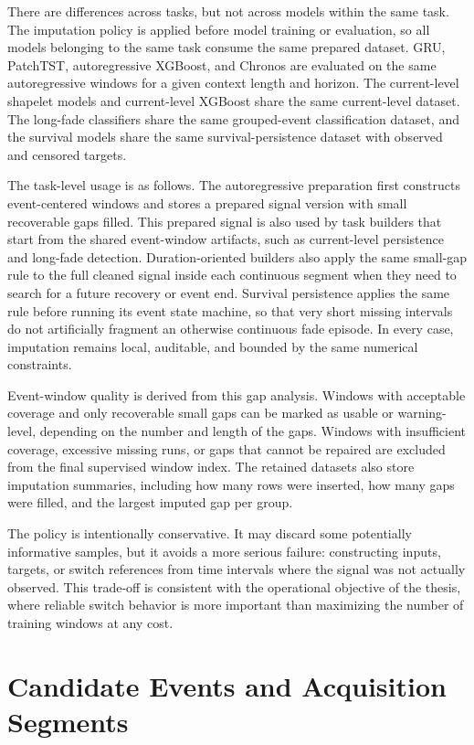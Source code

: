 There are differences across tasks, but not across models within the same
task. The imputation policy is applied before model training or evaluation, so
all models belonging to the same task consume the same prepared dataset. GRU,
PatchTST, autoregressive XGBoost, and Chronos are evaluated on the same
autoregressive windows for a given context length and horizon. The
current-level shapelet models and current-level XGBoost share the same
current-level dataset. The long-fade classifiers share the same grouped-event
classification dataset, and the survival models share the same
survival-persistence dataset with observed and censored targets.

The task-level usage is as follows. The autoregressive preparation first
constructs event-centered windows and stores a prepared signal version with
small recoverable gaps filled. This prepared signal is also used by task
builders that start from the shared event-window artifacts, such as
current-level persistence and long-fade detection. Duration-oriented builders
also apply the same small-gap rule to the full cleaned signal inside each
continuous segment when they need to search for a future recovery or event end.
Survival persistence applies the same rule before running its event state
machine, so that very short missing intervals do not artificially fragment an
otherwise continuous fade episode. In every case, imputation remains local,
auditable, and bounded by the same numerical constraints.

Event-window quality is derived from this gap analysis. Windows with acceptable
coverage and only recoverable small gaps can be marked as usable or
warning-level, depending on the number and length of the gaps. Windows with
insufficient coverage, excessive missing runs, or gaps that cannot be repaired
are excluded from the final supervised window index. The retained datasets also
store imputation summaries, including how many rows were inserted, how many
gaps were filled, and the largest imputed gap per group.

The policy is intentionally conservative. It may discard some potentially
informative samples, but it avoids a more serious failure: constructing inputs,
targets, or switch references from time intervals where the signal was not
actually observed. This trade-off is consistent with the operational objective
of the thesis, where reliable switch behavior is more important than
maximizing the number of training windows at any cost.

\section{Candidate Events and Acquisition Segments}

